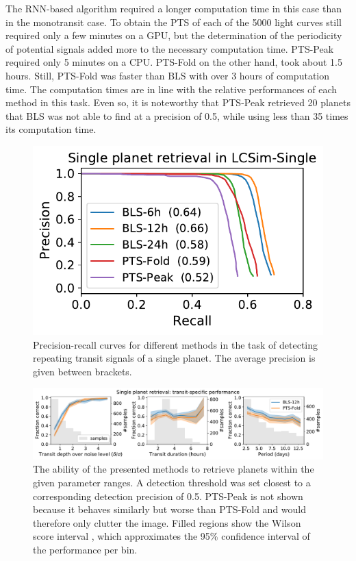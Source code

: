The RNN-based algorithm required a longer computation time in this case than in the monotransit case. To obtain the PTS of each of the 5000 light curves still required only a few minutes on a GPU, but the determination of the periodicity of potential signals added more to the necessary computation time. PTS-Peak required only 5 minutes on a CPU. PTS-Fold on the other hand, took about 1.5 hours. Still, PTS-Fold was faster than BLS with over 3 hours of computation time. The computation times are in line with the relative performances of each method in this task. Even so, it is noteworthy that PTS-Peak retrieved 20 planets that BLS was not able to find at a precision of 0.5, while using less than 35 times its computation time.


\begin{figure}
    \centering
    \includegraphics[width=0.35\linewidth]{Experiments/Figures/Singles/single_pr.pdf}
    \caption{Precision-recall curves for different methods in the task of detecting repeating transit signals of a single planet. The average precision is given between brackets.}
    \label{fig:single_pr}
\end{figure}


\begin{figure}
    \centering
    \includegraphics[width=\linewidth]{Experiments/Figures/Singles/single_transit_specific.pdf}
    \caption{The ability of the presented methods to retrieve planets within the given parameter ranges. A detection threshold was set closest to a corresponding detection precision of 0.5. PTS-Peak is not shown because it behaves similarly but worse than PTS-Fold and would therefore only clutter the image. Filled regions show the Wilson score interval \citep{wilson1927probable}, which approximates the 95\% confidence interval of the performance per bin.}
    \label{fig:single_transit}
\end{figure}



